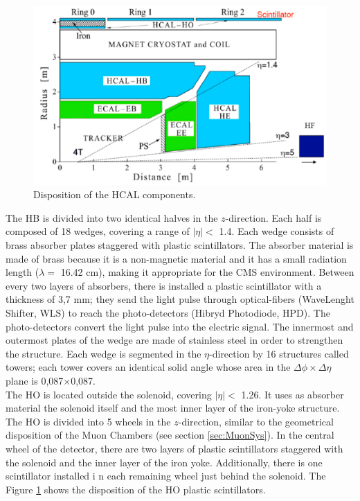 

\begin{center}
\begin{figure}[h]
\centering
\includegraphics[scale=0.4]{figuras/Chapter2/HCAL1}
\caption{Disposition of the HCAL components.}\label{figchp2:HCAL}
\end{figure}
\end{center}

The HB is divided into two identical halves in the $z$-direction. Each half is composed of 18
wedges, covering a range of $|\eta| < $ 1.4. Each wedge consists of brass absorber plates 
staggered with plastic scintillators. The absorber material is made of brass 
because it is a non-magnetic material and it has a small 
radiation length ($\lambda = $ 16.42 cm), making it appropriate for the CMS environment. Between every
two layers of absorbers, there is installed a plastic scintillator with a thickness of 3,7 mm; they send 
the light pulse through optical-fibers (WaveLenght Shifter, WLS) to reach the 
photo-detectors (Hibryd Photodiode, HPD). The photo-detectors convert the light pulse 
into the electric signal. The innermost and 
outermost plates of the wedge are made of stainless steel in order to strengthen the structure. Each wedge 
is segmented in the $\eta$-direction by 16 structures called towers; each tower 
covers an identical solid angle whose area in the $\Delta\phi\times\Delta\eta$ plane is 0,087$\times$0,087. \\

The HO is located outside the solenoid, covering $|\eta| < $ 1.26. It uses as absorber 
material the solenoid itself and the most inner layer of the 
iron-yoke structure. The HO is divided into
5 wheels in the $z$-direction, similar to the geometrical disposition 
of the Muon Chambers (see section \ref{sec:MuonSys}). In the central wheel of the detector, there 
are two layers of plastic scintillators staggered with the solenoid and the inner 
layer of the iron yoke. Additionally, there is one scintillator installed i
n each remaining wheel just behind the solenoid. The Figure \ref{figchp2:HCAL} shows the disposition of 
the HO plastic scintillators. \\

